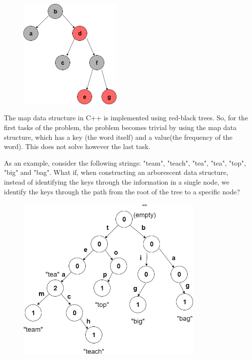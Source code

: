 \documentclass[letterpaper]{article}
\begin{document}
\begin{figure} [h!]
\centering
\includegraphics[width=0.45\textwidth]{pngOfDiagrams/redblacktree.png}
\end{figure}

\newpage

The map data structure in C++ is implemented using red-black trees. So, for the first tasks of the problem, the problem becomes trivial by using the map data structure, which has a key (the word itself) and a value(the frequency of the word). This does not solve however the last task.

As an example, consider the following strings: "team", "teach", "tea", "tea", "top", "big" and "bag". What if, when constructing an arborescent data structure, instead of identifying the keys through the information in a single node, we identify the keys through the path from the root of the tree to a specific node?

\begin{figure} [h!]
\centering
\includegraphics[width=0.82\textwidth]{pngOfDiagrams/trie}
\end{figure}
\end{document}
